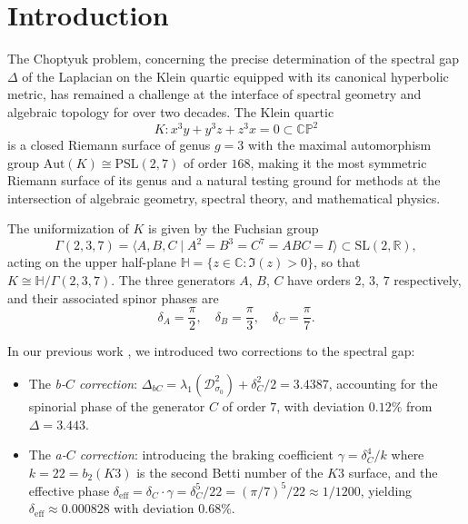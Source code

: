 \documentclass[12pt,a4paper]{article}
\theoremstyle{definition}
\theoremstyle{remark}
\newcommand{\CC}{\mathbb{C}}
\newcommand{\RR}{\mathbb{R}}
\newcommand{\PP}{\mathbb{P}}
\newcommand{\HH}{\mathbb{H}}
\newcommand{\SL}{\mathrm{SL}}
\newcommand{\PSL}{\mathrm{PSL}}
\newcommand{\Aut}{\mathrm{Aut}}
\newcommand{\cD}{\mathcal{D}}
\begin{document}
\tableofcontents

\newpage
\section{Introduction}

The Choptyuk problem, concerning the precise determination of the spectral gap $\Delta$ of the Laplacian on the Klein quartic equipped with its canonical hyperbolic metric, has remained a challenge at the interface of spectral geometry and algebraic topology for over two decades. The Klein quartic
\begin{equation}
K \colon x^3y + y^3z + z^3x = 0 \subset \CC\PP^2
\end{equation}
is a closed Riemann surface of genus $g = 3$ with the maximal automorphism group $\Aut(K) \cong \PSL(2,7)$ of order $168$, making it the most symmetric Riemann surface of its genus and a natural testing ground for methods at the intersection of algebraic geometry, spectral theory, and mathematical physics.

The uniformization of $K$ is given by the Fuchsian group
\begin{equation}
\Gamma(2,3,7) = \langle A, B, C \mid A^2 = B^3 = C^7 = ABC = I \rangle \subset \SL(2,\RR),
\end{equation}
acting on the upper half-plane $\HH = \{z \in \CC : \Im(z) > 0\}$, so that $K \cong \HH/\Gamma(2,3,7)$. The three generators $A$, $B$, $C$ have orders $2$, $3$, $7$ respectively, and their associated spinor phases are
\begin{equation}
\delta_A = \frac{\pi}{2}, \quad \delta_B = \frac{\pi}{3}, \quad \delta_C = \frac{\pi}{7}.
\end{equation}

In our previous work \cite{Choptyuk2025}, we introduced two corrections to the spectral gap:
\begin{itemize}
\item The \emph{b-$C$ correction}: $\Delta_{bC} = \lambda_1(\cD^2_{\sigma_0}) + \delta_C^2/2 = 3.4387$, accounting for the spinorial phase of the generator $C$ of order $7$, with deviation $0.12\%$ from $\Delta = 3.443$.
\item The \emph{a-$C$ correction}: introducing the braking coefficient $\gamma = \delta_C^4/k$ where $k = 22 = b_2(K3)$ is the second Betti number of the $K3$ surface, and the effective phase $\delta_{\mathrm{eff}} = \delta_C \cdot \gamma = \delta_C^5/22 = (\pi/7)^5/22 \approx 1/1200$, yielding $\delta_{\mathrm{eff}} \approx 0.000828$ with deviation $0.68\%$.
\end{itemize}
\end{document}
